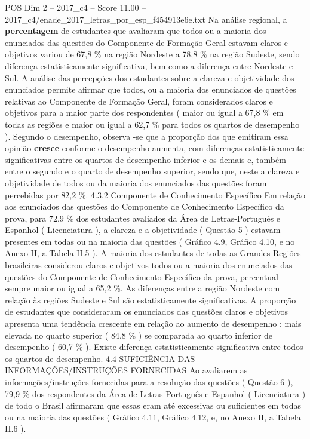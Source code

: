 \begin{textsample}{POS Dim 2 – 2017\_c4 – Score 11.00 – 2017\_c4/enade\_2017\_letras\_por\_esp\_f454913e6e.txt}
Na análise regional, a \textbf{percentagem} de estudantes que avaliaram que todos ou a maioria dos enunciados das questões do Componente de Formação Geral estavam claros e objetivos variou de 67,8 \% na região Nordeste a 78,8 \% na região Sudeste, sendo diferença estatisticamente significativa, bem como a diferença entre Nordeste e Sul.
A análise das percepções dos estudantes sobre a clareza e objetividade dos enunciados permite afirmar que todos, ou a maioria dos enunciados de questões relativas ao Componente de Formação Geral, foram considerados claros e objetivos para a maior parte dos respondentes ( maior ou igual a 67,8 \% em todas as regiões e maior ou igual a 62,7 \% para todos os quartos de desempenho ).
Segundo o desempenho, observa -se que a proporção dos que emitiram essa opinião \textbf{cresce} conforme o desempenho aumenta, com diferenças estatisticamente significativas entre os quartos de desempenho inferior e os demais e, também entre o segundo e o quarto de desempenho superior, sendo que, neste a clareza e objetividade de todos ou da maioria dos enunciados das questões foram percebidas por 82,2 \%. 4.3.2 Componente de Conhecimento Específico Em relação aos enunciados das questões do Componente de Conhecimento Específico da prova, para 72,9 \% dos estudantes avaliados da Área de Letras-Português e Espanhol ( Licenciatura ), a clareza e a objetividade ( Questão 5 ) estavam presentes em todas ou na maioria das questões ( Gráfico 4.9, Gráfico 4.10, e no Anexo II, a Tabela II.5 ).
A maioria dos estudantes de todas as Grandes Regiões brasileiras considerou claros e objetivos todos ou a maioria dos enunciados das questões do Componente de Conhecimento Específico da prova, percentual sempre maior ou igual a 65,2 \%.
As diferenças entre a região Nordeste com relação às regiões Sudeste e Sul são estatisticamente significativas.
A proporção de estudantes que consideraram os enunciados das questões claros e objetivos apresenta uma tendência crescente em relação ao aumento de desempenho : mais elevada no quarto superior ( 84,8 \% ) se comparada ao quarto inferior de desempenho ( 60,7 \% ).
Existe diferença estatisticamente significativa entre todos os quartos de desempenho. 4.4 SUFICIÊNCIA DAS INFORMAÇÕES/INSTRUÇÕES FORNECIDAS Ao avaliarem as informações/instruções fornecidas para a resolução das questões ( Questão 6 ), 79,9 \% dos respondentes da Área de Letras-Português e Espanhol ( Licenciatura ) de todo o Brasil afirmaram que essas eram até excessivas ou suficientes em todas ou na maioria das questões ( Gráfico 4.11, Gráfico 4.12, e, no Anexo II, a Tabela II.6 ).

\end{textsample}
